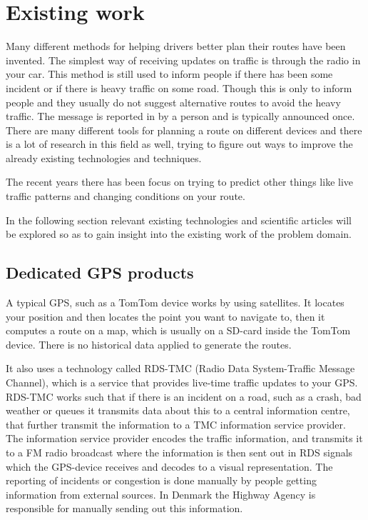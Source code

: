 \section{Existing work}\label{sec:existingwork}
Many different methods for helping drivers better plan their routes have been invented.
The simplest way of receiving updates on traffic is through the radio in your car. This method is still used to inform people if there has been some incident or if there is heavy traffic on some road. Though this is only to inform people and they usually do not suggest alternative routes to avoid the heavy traffic. The message is reported in by a person and is typically announced once.
There are many different tools for planning a route on different devices and there is a lot of research in this field as well, trying to figure out ways to improve the already existing technologies and techniques. %

The recent years there has been focus on trying to predict other things like live traffic patterns and changing conditions on your route.\cite{GoogleMapPrediction}

In the following section relevant existing technologies and scientific articles will be explored so as to gain insight into the existing work of the problem domain.
\subsection*{Dedicated GPS products}
A typical GPS, such as a TomTom device works by using satellites. It locates your position and then locates the point you want to navigate to, then it computes a route on a map, which is usually on a SD-card inside the TomTom device. There is no historical data applied to generate the routes.

It also uses a technology called RDS-TMC (Radio Data System-Traffic Message Channel), which is a service that provides live-time traffic updates to your GPS. RDS-TMC works such that if there is an incident on a road, such as a crash, bad weather or queues it transmits data about this to a central information centre, that further transmit the information to a TMC information service provider. The information service provider encodes the traffic information, and transmits it to a FM radio broadcast where the information is then sent out in RDS signals which the GPS-device receives and decodes to a visual representation. The reporting of incidents or congestion is done manually by people getting information from external sources. In Denmark the Highway Agency is responsible for manually sending out this information\cite{Vejdirektorat}.

